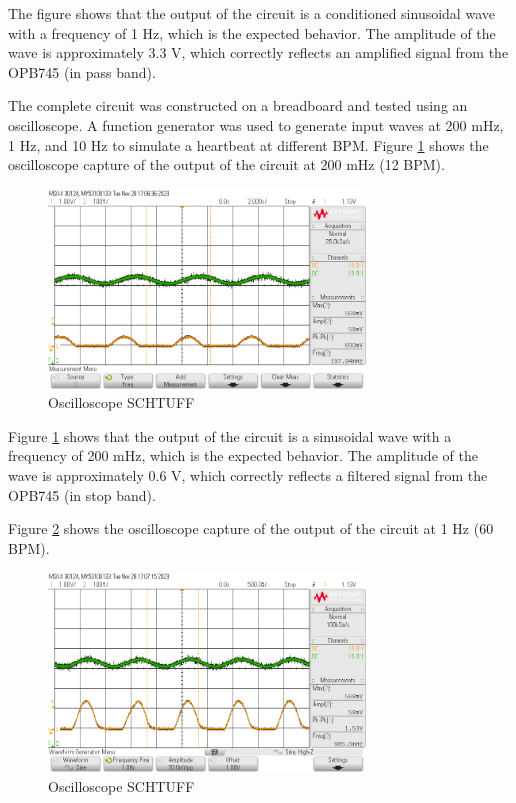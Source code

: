 \documentclass[CMPE]{KGCOEReport}
\begin{document}
The figure shows that the output of the circuit is a conditioned sinusoidal wave with a frequency of 1 Hz, which is the expected behavior. The amplitude of the wave is approximately 3.3 V, which correctly reflects an amplified signal from the OPB745 (in pass band).

The complete circuit was constructed on a breadboard and tested using an oscilloscope. A function generator was used to generate input waves at 200 mHz, 1 Hz, and 10 Hz to simulate a heartbeat at different BPM. Figure \ref{fig:200mHzCapture} shows the oscilloscope capture of the output of the circuit at 200 mHz (12 BPM).

\begin{figure}[H]
    \centering
    \includegraphics[width=0.75\textwidth]{200mHz.png}
    \caption{Oscilloscope SCHTUFF}
    \label{fig:200mHzCapture}
\end{figure}

Figure \ref{fig:200mHzCapture} shows that the output of the circuit is a sinusoidal wave with a frequency of 200 mHz, which is the expected behavior. The amplitude of the wave is approximately 0.6 V, which correctly reflects a filtered signal from the OPB745 (in stop band).

Figure \ref{fig:1HzCapture} shows the oscilloscope capture of the output of the circuit at 1 Hz (60 BPM).

\begin{figure}[H]
    \centering
    \includegraphics[width=0.75\textwidth]{1Hz.png}
    \caption{Oscilloscope SCHTUFF}
    \label{fig:1HzCapture}
\end{figure}
\end{document}

